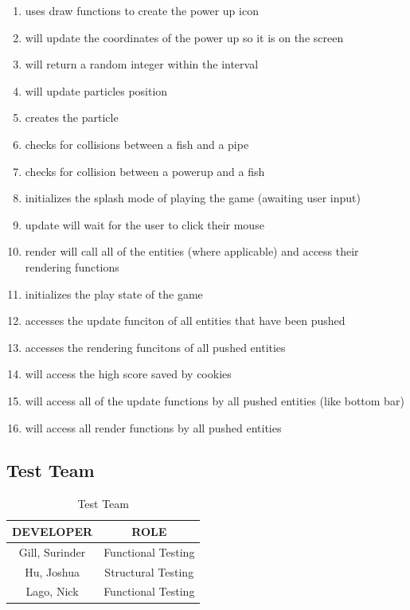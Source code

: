 \documentclass[11pt, oneside]{article}   	%
\begin{document}
\begin{enumerate}
\item uses draw functions to create the power up icon

\item  will update the coordinates of the power up so it is on the screen 

\item will return a random integer within the interval

\item will update particles position

\item  creates the particle

\item checks for collisions between a fish and a pipe

\item  checks for collision between a powerup and a fish

\item  initializes the splash mode of playing the game (awaiting user input)

\item  update will wait for the user to click their mouse

\item  render will call all of the entities (where applicable) and access their rendering functions

\item initializes the play state of the game 

\item accesses the update funciton of all entities that have been pushed

\item accesses the rendering funcitons of all pushed entities

\item will access the high score saved by cookies

\item will access all of the update functions by all pushed entities (like bottom bar)

\item will access all render functions by all pushed entities

\end{enumerate}


\subsection{Test Team}
\begin{table}[H]
\caption{Test Team}
\begin{center}
\label{tab:}
\begin{tabular}{|c|c|}
\hline
\bfseries DEVELOPER & \bfseries ROLE\\
\hline
Gill, Surinder & Functional Testing\\
\hline
Hu, Joshua & Structural Testing\\
\hline
Lago, Nick & Functional Testing\\
\hline
\end{tabular}
\end{center}
\label{default}
\end{table}
\end{document}
